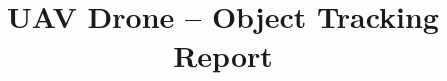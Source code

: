 \documentclass{exam}
\begin{document}
\title{\textbf{UAV Drone -- Object Tracking Report}}

\author{}
\maketitle

\end{document}
